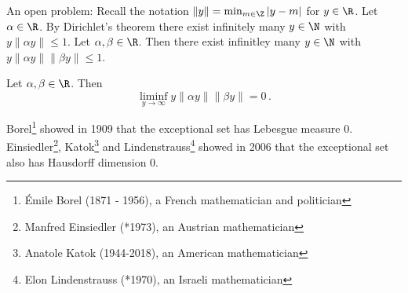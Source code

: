An open problem: Recall the notation \( \|y\| = \min_{m \in \Z} |y-m| \) for \( y \in \R \).
Let \( \alpha \in \R \).
By Dirichlet's theorem there exist infinitely many \( y \in \N \) with \( y \|\alpha y \| \leq 1 \).
Let \( \alpha, \beta \in \R \).
Then there exist infinitley many \( y \in \N \) with \( y \|\alpha y\| \|\beta y\| \leq 1 \).

\begin{conj*} 
	Let \( \alpha,\beta \in \R \).
	Then
	\[ \liminf_{y \to \infty} y \|\alpha y\| \|\beta y\| = 0 \,. \]
\end{conj*}

Borel\footnote{Émile Borel (1871 - 1956), a French mathematician and politician} showed in 1909 that the exceptional set has Lebesgue measure 0.
Einsiedler\footnote{Manfred Einsiedler (*1973), an Austrian mathematician}, Katok\footnote{Anatole Katok (1944-2018), an American mathematician} and Lindenstrauss\footnote{Elon Lindenstrauss (*1970), an Israeli mathematician} showed in 2006 that the exceptional set also has Hausdorff dimension 0.